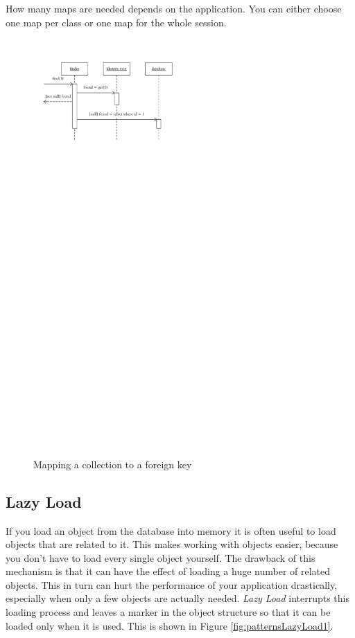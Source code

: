 			How many maps are needed depends on the application. You can either choose one
			map per class or one map for the whole session. 

			\begin{figure}[htb]
				\begin{center}
					\includegraphics{./files/inc/figures/patternsIdentityMap}
					\caption{\label{fig:patternsIdentityMap} Mapping a collection to a foreign key}
				\end{center}
			\end{figure}

		\subsection{Lazy Load}
		\label{subsec:lazyLoad}
			If you load an object from the database into memory it is often useful to
			load objects that are related to it. This makes working with objects easier,
			because you don't have to load every single object yourself. The drawback of
			this mechanism is that it can have the effect of loading a huge number of
			related objects. This in turn can hurt the performance of your application
			drastically, especially when only a few objects are actually needed.
			\textit{Lazy Load} interrupts this loading process and leaves a marker in the
			object structure so that it can be loaded only 
			when it is used. This is shown in Figure \ref{fig:patternsLazyLoad1}.

